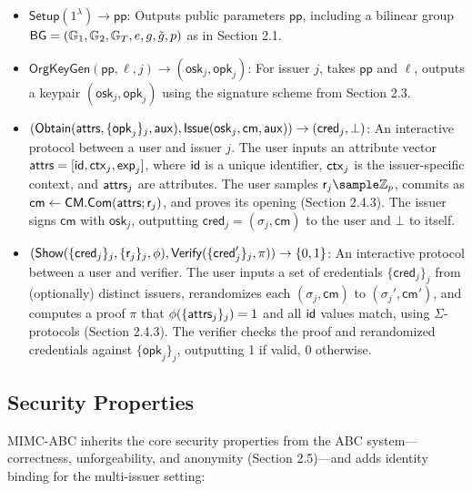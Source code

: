 \begin{definition}
    \begin{itemize}
    \item $\mathsf{Setup}(1^\lambda) \to \mathsf{pp}$: Outputs public parameters $\mathsf{pp}$, including a bilinear group $\mathsf{BG} = (\mathbb{G}_1, \mathbb{G}_2, \mathbb{G}_T, e, g, \tilde{g}, p)$ as in Section 2.1.
    
    \item $\mathsf{OrgKeyGen}(\mathsf{pp}, \ell, j) \to (\mathsf{osk}_j, \mathsf{opk}_j)$: For issuer $j$, takes $\mathsf{pp}$ and $\ell$, outputs a keypair $(\mathsf{osk}_j, \mathsf{opk}_j)$ using the signature scheme from Section 2.3.

    \item $(\mathsf{Obtain}(\mathsf{attrs}, \{\mathsf{opk}_j\}_j, \mathsf{aux}), \mathsf{Issue}(\mathsf{osk}_j, \mathsf{cm}, \mathsf{aux})) \to (\mathsf{cred}_j, \bot)$: An interactive protocol between a user and issuer $j$. The user inputs an attribute vector $\mathsf{attrs} = [\mathsf{id}, \mathsf{ctx}_j, \mathsf{exp}_j]$, where $\mathsf{id}$ is a unique identifier, $\mathsf{ctx}_j$ is the issuer-specific context, and $\mathsf{attrs}_j$ are attributes. The user samples $\usk_j \sample \Z_p$, commits as $\mathsf{cm} \gets \mathsf{CM.Com}(\mathsf{attrs}; \mathsf{r}_j)$, and proves its opening (Section 2.4.3). The issuer signs $\mathsf{cm}$ with $\mathsf{osk}_j$, outputting $\mathsf{cred}_j = (\sigma_j, \mathsf{cm})$ to the user and $\bot$ to itself.

    \item $(\mathsf{Show}(\{\mathsf{cred}_j\}_j, \{\mathsf{r}_j\}_j, \phi), \mathsf{Verify}(\{\mathsf{cred}_j'\}_j, \pi)) \to \{0,1\}$: An interactive protocol between a user and verifier. The user inputs a set of credentials $\{\mathsf{cred}_j\}_j$ from (optionally) distinct issuers, rerandomizes each $(\sigma_j, \mathsf{cm})$ to $(\sigma_j', \mathsf{cm}')$, and computes a proof $\pi$ that $\phi(\{\mathsf{attrs}_j\}_j) = 1$ and all $\mathsf{id}$ values match, using $\Sigma$-protocols (Section 2.4.3). The verifier checks the proof and rerandomized credentials against $\{\mathsf{opk}_j\}_j$, outputting 1 if valid, 0 otherwise.
\end{itemize}
\end{definition}


\subsection{Security Properties}

MIMC-ABC inherits the core security properties from the ABC system—correctness, unforgeability, and anonymity (Section 2.5)—and adds identity binding for the multi-issuer setting:

